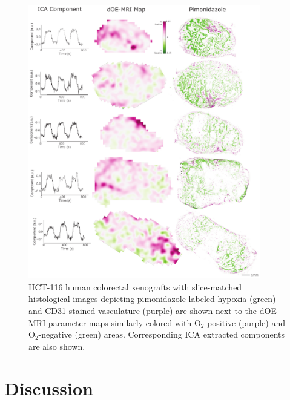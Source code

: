 \begin{figure}[htbp]
   \centering
   \includegraphics[width=0.9\textwidth]{oemri_thesis1/oemri_thesis1-images/fig7_hct116.pdf} %
   \caption{HCT-116 human colorectal xenografts with slice-matched histological images depicting pimonidazole-labeled hypoxia (green) and \acs{CD31}-stained vasculature (purple) are shown next to the \acs{dOE-MRI} parameter maps similarly colored with O$_2$-positive (purple) and O$_2$-negative (green) areas. Corresponding \acs{ICA} extracted components are also shown.
   \label{fig_hct116}}
\end{figure}


\section{Discussion}

